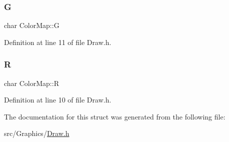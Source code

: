 \subsubsection{\texorpdfstring{G}{G}}
{\footnotesize\ttfamily char Color\+Map\+::G}



Definition at line 11 of file Draw.\+h.

\mbox{\label{struct_color_map_a23346cc90a7c2bc2fb2f1e046a45e0f3}} 
\subsubsection{\texorpdfstring{R}{R}}
{\footnotesize\ttfamily char Color\+Map\+::R}



Definition at line 10 of file Draw.\+h.



The documentation for this struct was generated from the following file\+:\begin{DoxyCompactItemize}
\item 
src/\+Graphics/\mbox{\hyperlink{_draw_8h}{Draw.\+h}}\end{DoxyCompactItemize}
